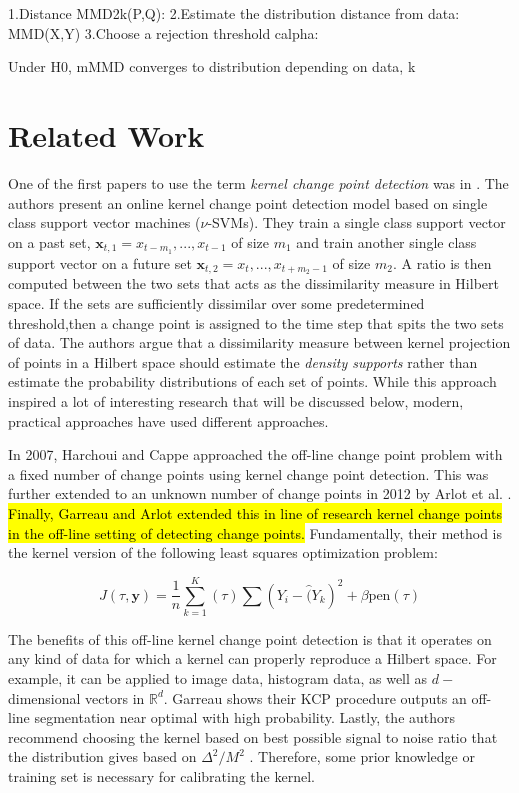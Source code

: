 1.Distance MMD2k(P,Q):
2.Estimate the distribution distance from data: MMD(X,Y)
3.Choose a rejection threshold calpha:

Under H0, mMMD converges to distribution depending on data, k

\section{Related Work}

One of the first papers to use the term \textit{kernel change point detection} was in \cite{desobry2005online}. The authors present an online kernel change point detection model based on single class support vector machines ($\nu$-SVMs). They train a single class support vector on a past set, $\mathbf{x}_{t,1}={x_{t-m_1},...,x_{t-1}}$ of size $m_1$ and train another single class support vector on a future set $\mathbf{x}_{t,2}={x_t,...,x_{t+m_2-1}}$ of size $m_2$. A ratio is then computed between the two sets that acts as the dissimilarity measure in Hilbert space. If the sets are sufficiently dissimilar over some predetermined threshold,then a change point is assigned to the time step that spits the two sets of data. The authors argue that a dissimilarity measure between kernel projection of points in a Hilbert space should estimate the \textit{density supports} rather than estimate the probability distributions of each set of points. While this approach inspired a lot of interesting research that will be discussed below, modern, practical approaches have used different approaches.

In 2007, Harchoui and Cappe \cite{harchaoui2007retrospective} approached the off-line change point problem with a fixed number of change points using kernel change point detection. This was further extended to an unknown number of change points in 2012 by Arlot et al. \cite{arlot2012kernel}. \hl{Finally, Garreau and Arlot extended this in line of research kernel change points in the off-line setting of detecting change points.} Fundamentally, their method is the kernel version of the following least squares optimization problem:

\begin{equation}
J(\tau, \mathbf{y}) = \frac{1}{n} \sum_{k=1}^K(\tau) \sum (Y_i - \hat(Y_k)^2 + \beta \text{pen}(\tau)
\end{equation}


The benefits of this off-line kernel change point detection is that it operates on any kind of data for which a kernel can properly reproduce a Hilbert space. For example, it can be applied to image data, histogram data, as well as $d-$dimensional vectors in $\mathbb{R}^d$. Garreau shows their KCP procedure outputs an off-line segmentation near optimal with high probability. Lastly, the authors recommend choosing the kernel based on best possible signal to noise ratio that the distribution gives based on $ \Delta^2 / M^2$ . Therefore, some prior knowledge or training set is necessary for calibrating the kernel. 

